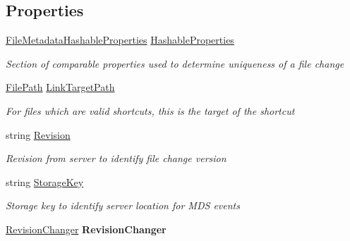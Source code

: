 \subsection*{Properties}
\begin{DoxyCompactItemize}
\item 
\hyperlink{struct_cloud_api_public_1_1_model_1_1_file_metadata_hashable_properties}{File\-Metadata\-Hashable\-Properties} \hyperlink{class_cloud_api_public_1_1_model_1_1_file_metadata_aa40b8886d1ecaf346722de47c9ec5c29}{Hashable\-Properties}
\begin{DoxyCompactList}\small\item\em Section of comparable properties used to determine uniqueness of a file change \end{DoxyCompactList}\item 
\hyperlink{class_cloud_api_public_1_1_model_1_1_file_path}{File\-Path} \hyperlink{class_cloud_api_public_1_1_model_1_1_file_metadata_a633d3003a1d5d3f5f43e722516fd466b}{Link\-Target\-Path}
\begin{DoxyCompactList}\small\item\em For files which are valid shortcuts, this is the target of the shortcut \end{DoxyCompactList}\item 
string \hyperlink{class_cloud_api_public_1_1_model_1_1_file_metadata_a92dcb8b7561985fc7e817f154f50b61d}{Revision}
\begin{DoxyCompactList}\small\item\em Revision from server to identify file change version \end{DoxyCompactList}\item 
string \hyperlink{class_cloud_api_public_1_1_model_1_1_file_metadata_a0290dee37319988ca953fb76c9502cd1}{Storage\-Key}
\begin{DoxyCompactList}\small\item\em Storage key to identify server location for M\-D\-S events \end{DoxyCompactList}\item 
\hypertarget{class_cloud_api_public_1_1_model_1_1_file_metadata_aeaef7d02e1932ef402c8e89f1e81570a}{\hyperlink{class_cloud_api_public_1_1_model_1_1_revision_changer}{Revision\-Changer} {\bfseries Revision\-Changer}}\label{class_cloud_api_public_1_1_model_1_1_file_metadata_aeaef7d02e1932ef402c8e89f1e81570a}

\end{DoxyCompactItemize}


